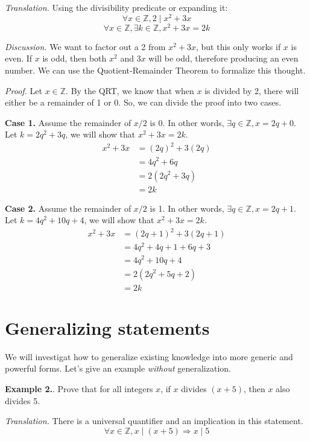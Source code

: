 \documentclass{article}
\newcounter{excount}
\newcommand\ex{\stepcounter{excount} \textbf{Example 2.\theexcount}. }
\begin{document}
\textit{Translation.} Using the divisibility predicate or expanding it: 
$$\forall x \in \mathbb{Z}, 2 \mid x^2 + 3x$$
$$\forall x \in \mathbb{Z}, \exists k \in \mathbb{Z}, x^2 + 3x = 2k$$

\textit{Discussion.} We want to factor out a 2 from $x^2 + 3x$, but this only 
works if $x$ is even. If $x$ is odd, then both $x^2$ and $3x$ will be odd, 
therefore producing an even number. We can use the Quotient-Remainder Theorem to 
formalize this thought.

\textit{Proof.} Let $x \in \mathbb{Z}$. By the QRT, we know that when $x$ is 
divided by 2, there will either be a remainder of 1 or 0. So, we can divide the 
proof into two cases. 

\textbf{Case 1.} Assume the remainder of $x/2$ is 0. In other words, $\exists q 
\in \mathbb{Z}, x = 2q + 0$. Let $k = 2q^2 + 3q$, we will show that $x^2 + 3x = 2k$.
\begin{align*}
    x^2 + 3x &= (2q)^2 + 3(2q) \\
             &= 4q^2 + 6q \\
             &= 2(2q^2 + 3q) \\
             &= 2k
\end{align*}

\textbf{Case 2.} Assume the remainder of $x/2$ is 1. In other words, $\exists q 
\in \mathbb{Z}, x = 2q + 1$. Let $k = 4q^2 + 10q + 4$, we will show that 
$x^2 + 3x = 2k$.
\begin{align*}
    x^2 + 3x &= (2q + 1)^2 + 3(2q + 1)\\
             &= 4q^2 + 4q + 1 + 6q + 3 \\
             &= 4q^2 + 10q + 4 \\
             &= 2(2q^2 + 5q + 2) \\
             &= 2k 
\end{align*}

\section{Generalizing statements}
We will investigat how to generalize existing knowledge into more generic 
and powerful forms. Let's give an example \textit{without} generalization.

\ex Prove that for all integers $x$, if $x$ divides $(x + 5)$, then $x$ also 
divides 5. 

\textit{Translation.} There is a universal quantifier and an implication 
in this statement. 
$$\forall x \in \mathbb{Z}, x \mid (x+5) \Rightarrow x \mid 5$$
\end{document}
